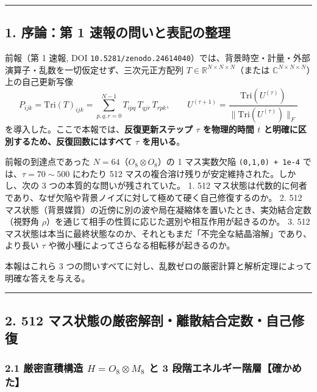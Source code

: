 \documentclass[
  a4paper,
]{ltjsarticle}
\begin{document}
\begin{center}\rule{0.5\linewidth}{0.5pt}\end{center}

\subsection{1. 序論：第 1
速報の問いと表記の整理}\label{ux5e8fux8ad6ux7b2c-1-ux901fux5831ux306eux554fux3044ux3068ux8868ux8a18ux306eux6574ux7406}

前報（第 1 速報, DOI
\texttt{10.5281/\allowbreak{}zenodo.24614040}）では、背景時空・計量・外部演算子・乱数を一切仮定せず、三次元正方配列
\(T \in \mathbb{R}^{N\times N\times N}\)（または
\(\mathbb{C}^{N\times N\times N}\)）上の自己更新写像
\[P_{ijk} = \mathrm{Tri}(T)_{ijk} = \sum_{p,q,r=0}^{N-1} T_{ipq}\, T_{qjr}\, T_{rpk}, \qquad U^{(\tau+1)} = \frac{\mathrm{Tri}(U^{(\tau)})}{\|\mathrm{Tri}(U^{(\tau)})\|_F}\]
を導入した。ここで本報では、\textbf{反復更新ステップ \(\tau\)
を物理的時間 \(t\) と明確に区別するため、反復回数にはすべて \(\tau\)
を用いる}。

前報の到達点であった \(N=64\)（\(O_8 \otimes O_8\)）の 1 マス実数欠陥
\texttt{(0,1,0)\ +\ 1e-4} では、\(\tau = 70 \sim 500\) にわたり 512
マスの複合溶け残りが安定維持された。しかし、次の 3
つの本質的な問いが残されていた。 1. 512
マス状態は代数的に何者であり、なぜ欠陥や背景ノイズに対して極めて硬く自己修復するのか。
2. 512
マス状態（背景媒質）の近傍に別の波や局在凝縮体を置いたとき、実効結合定数（視野角
\(\rho\)）を通じて相手の性質に応じた選別や相互作用が起きるのか。 3. 512
マス状態は本当に最終状態なのか、それともまだ「不完全な結晶溶解」であり、より長い
\(\tau\) や微小種によってさらなる相転移が起きるのか。

本報はこれら 3
つの問いすべてに対し、乱数ゼロの厳密計算と解析定理によって明確な答えを与える。

\begin{center}\rule{0.5\linewidth}{0.5pt}\end{center}

\subsection{2. 512
マス状態の厳密解剖・離散結合定数・自己修復}\label{ux30deux30b9ux72b6ux614bux306eux53b3ux5bc6ux89e3ux5256ux96e2ux6563ux7d50ux5408ux5b9aux6570ux81eaux5df1ux4feeux5fa9}

\subsubsection{\texorpdfstring{2.1 厳密直積構造 \(H = O_8 \otimes M_8\)
と 3
段階エネルギー階層【確かめた】}{2.1 厳密直積構造 H = O\_8 \textbackslash otimes M\_8 と 3 段階エネルギー階層【確かめた】}}\label{ux53b3ux5bc6ux76f4ux7a4dux69cbux9020-h-o_8-otimes-m_8-ux3068-3-ux6bb5ux968eux30a8ux30cdux30ebux30aeux30fcux968eux5c64ux78baux304bux3081ux305f}
\end{document}
